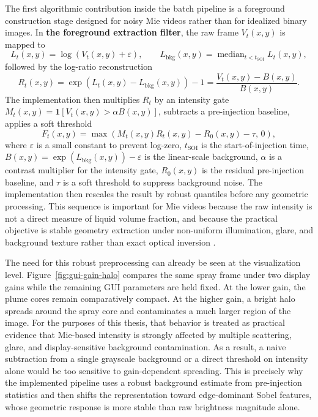 \documentclass[english, 12pt, a4paper, elec, utf8, a-2b, online]{aaltothesis}
\begin{document}
The first algorithmic contribution inside the batch pipeline is a foreground construction stage designed for noisy Mie videos rather than for idealized binary images. In \textbf{the foreground extraction filter}, the raw frame \(V_t(x,y)\) is mapped to
\[
L_t(x,y)=\log(V_t(x,y)+\varepsilon),
\qquad
L_{\mathrm{bkg}}(x,y)=\operatorname{median}_{t<t_{\mathrm{SOI}}} L_t(x,y),
\]
followed by the log-ratio reconstruction
\[
R_t(x,y)=\exp\!\left(L_t(x,y)-L_{\mathrm{bkg}}(x,y)\right)-1
=\frac{V_t(x,y)-B(x,y)}{B(x,y)}.
\]
The implementation then multiplies \(R_t\) by an intensity gate \(M_t(x,y)=\mathbf{1}[V_t(x,y)>\alpha B(x,y)]\), subtracts a pre-injection baseline, applies a soft threshold
\[
F_t(x,y)=\max\!\left(M_t(x,y)R_t(x,y)-R_0(x,y)-\tau,\,0\right),
\]
where \(\varepsilon\) is a small constant to prevent log-zero, \(t_{\mathrm{SOI}}\) is the start-of-injection time, \(B(x,y) = \exp(L_{\mathrm{bkg}}(x,y)) - \varepsilon\) is the linear-scale background, \(\alpha\) is a contrast multiplier for the intensity gate, \(R_0(x,y)\) is the residual pre-injection baseline, and \(\tau\) is a soft threshold to suppress background noise. The implementation then rescales the result by robust quantiles before any geometric processing. This sequence is important for Mie videos because the raw intensity is not a direct measure of liquid volume fraction, and because the practical objective is stable geometry extraction under non-uniform illumination, glare, and background texture rather than exact optical inversion \cite{BohrenHuffman2004,Linne2013SprayImaging,GonzalezWoodsDIP}.

The need for this robust preprocessing can already be seen at the visualization level. Figure~\ref{fig:gui-gain-halo} compares the same spray frame under two display gains while the remaining GUI parameters are held fixed. At the lower gain, the plume cores remain comparatively compact. At the higher gain, a bright halo spreads around the spray core and contaminates a much larger region of the image. For the purposes of this thesis, that behavior is treated as practical evidence that Mie-based intensity is strongly affected by multiple scattering, glare, and display-sensitive background contamination. As a result, a naive subtraction from a single grayscale background or a direct threshold on intensity alone would be too sensitive to gain-dependent spreading. This is precisely why the implemented pipeline uses a robust background estimate from pre-injection statistics and then shifts the representation toward edge-dominant Sobel features, whose geometric response is more stable than raw brightness magnitude alone.
\end{document}
